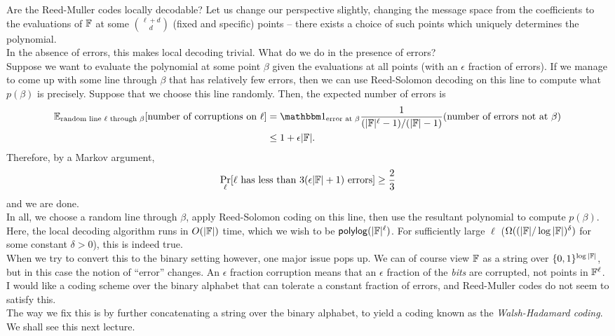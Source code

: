 		Are the Reed-Muller codes locally decodable? Let us change our perspective slightly, changing the message space from the coefficients to the evaluations of $\mathbb{F}$ at some $\binom{\ell+d}{d}$ (fixed and specific) points -- there exists a choice of such points which uniquely determines the polynomial.\\
		In the absence of errors, this makes local decoding trivial. What do we do in the presence of errors?\\
		Suppose we want to evaluate the polynomial at some point $\beta$ given the evaluations at all points (with an $\epsilon$ fraction of errors). If we manage to come up with some line through $\beta$ that has relatively few errors, then we can use Reed-Solomon decoding on this line to compute what $p(\beta)$ is precisely. Suppose that we choose this line randomly. Then, the expected number of errors is
		\begin{align*}
			\E_{\text{random line $\ell$ through $\beta$}}[\text{number of corruptions on $\ell$}] &= \indic_{\text{error at $\beta$}} \frac{1}{(|\F|^\ell-1)/(|\F|-1)} (\text{number of errors not at $\beta$}) \\
				&\le 1 + \epsilon|\F|.
		\end{align*}
		Therefore, by a Markov argument,
		\[ \Pr_{\ell} [\text{$\ell$ has less than $3(\epsilon|\mathbb{F}|+1)$ errors}] \ge \frac{2}{3} \]
		and we are done.\\

		In all, we choose a random line through $\beta$, apply Reed-Solomon coding on this line, then use the resultant polynomial to compute $p(\beta)$.\\
		Here, the local decoding algorithm runs in $O(|\mathbb{F}|)$ time, which we wish to be $\mathsf{polylog}(|\mathbb{F}|^{\ell})$. For sufficiently large $\ell$ ($\Omega( (|\mathbb{F}|/\log|\mathbb{F}|)^\delta)$ for some constant $\delta > 0$), this is indeed true.\\

		When we try to convert this to the binary setting however, one major issue pops up. We can of course view $\mathbb{F}$ as a string over $\{0,1\}^{\log |\mathbb{F}|}$, but in this case the notion of ``error'' changes. An $\epsilon$ fraction corruption means that an $\epsilon$ fraction of the \emph{bits} are corrupted, not points in $\mathbb{F}^\ell$.\\
		I would like a coding scheme over the binary alphabet that can tolerate a constant fraction of errors, and Reed-Muller codes do not seem to satisfy this.\\
		The way we fix this is by further concatenating a string over the binary alphabet, to yield a coding known as the \emph{Walsh-Hadamard coding}. We shall see this next lecture.